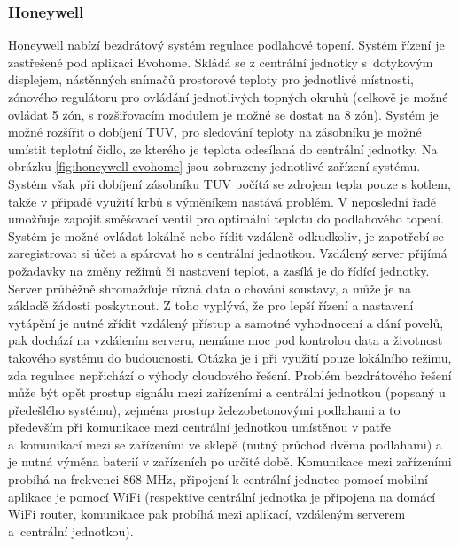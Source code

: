 \subsubsection{Honeywell}
Honeywell nabízí bezdrátový systém regulace podlahové topení. Systém řízení je zastřešené pod aplikaci Evohome. Skládá se z centrální jednotky s~dotykovým displejem, nástěnných snímačů prostorové teploty pro jednotlivé místnosti, zónového regulátoru pro ovládání jednotlivých topných okruhů (celkově je možné ovládat 5 zón, s rozšiřovacím modulem je možné se dostat na 8 zón). Systém je možné rozšířit o dobíjení TUV, pro sledování teploty na zásobníku je možné umístit teplotní čidlo, ze kterého je teplota odesílaná do centrální jednotky. Na obrázku \ref{fig:honeywell-evohome} jsou zobrazeny jednotlivé zařízení systému. Systém však při dobíjení zásobníku TUV počítá se zdrojem tepla pouze s kotlem, takže v případě využití krbů s výměníkem nastává problém. V neposlední řadě umožňuje zapojit směšovací ventil pro optimální teplotu do podlahového topení. Systém je možné ovládat lokálně nebo řídit vzdáleně odkudkoliv, je zapotřebí se zaregistrovat si účet a spárovat ho s  centrální jednotkou. Vzdálený server přijímá požadavky na změny režimů či nastavení teplot, a zasílá je do řídící jednotky. Server průběžně shromažďuje různá data o chování soustavy, a může je na základě žádosti poskytnout. Z toho vyplývá, že pro lepší řízení a nastavení vytápění je nutné zřídit vzdálený přístup a samotné vyhodnocení a dání povelů, pak dochází na vzdálením serveru, nemáme moc pod kontrolou data a životnost takového systému do budoucnosti. Otázka je i při využití pouze lokálního režimu, zda regulace nepřichází o výhody cloudového řešení. Problém bezdrátového řešení může být opět prostup signálu mezi zařízeními a centrální jednotkou (popsaný u předešlého systému), zejména prostup železobetonovými podlahami a to především při komunikace mezi centrální jednotkou umístěnou v patře a~komunikací mezi se zařízeními ve sklepě (nutný průchod dvěma podlahami) a je nutná výměna baterií v zařízeních po určité době. Komunikace mezi zařízeními probíhá na frekvenci 868 MHz, připojení k centrální jednotce pomocí mobilní aplikace je pomocí WiFi (respektive centrální jednotka je připojena na domácí WiFi router, komunikace pak probíhá mezi aplikací, vzdáleným serverem a~centrální jednotkou).

